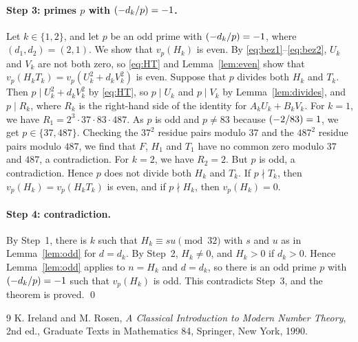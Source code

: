 \documentclass[11pt]{article}
\newcommand{\leg}[2]{\mathchoice{\biggl(\dfrac{#1}{#2}\biggr)}{(#1/#2)}{(#1/#2)}{(#1/#2)}}
\begin{document}
\paragraph{Step 3: primes $p$ with $\leg{-d_k}{p}=-1$.} Let $k\in\{1,2\}$, and let $p$ be an odd prime with $\leg{-d_k}{p}=-1$, where $(d_{1},d_{2})=(2,1)$. We show that $v_p(H_k)$ is even. By \eqref{eq:bez1}--\eqref{eq:bez2}, $U_k$ and $V_k$ are not both zero, so \eqref{eq:HT} and Lemma~\ref{lem:even} show that $v_p(H_kT_k)=v_p(U_k^2+d_kV_k^2)$ is even. Suppose that $p$ divides both $H_k$ and $T_k$. Then $p\mid U_k^2+d_kV_k^2$ by \eqref{eq:HT}, so $p\mid U_k$ and $p\mid V_k$ by Lemma~\ref{lem:divides}, and $p\mid R_k$, where $R_k$ is the right-hand side of the identity for $A_kU_k+B_kV_k$. For $k=1$, we have $R_{1}=2^{3}\cdot 37\cdot 83\cdot 487$. As $p$ is odd and $p\neq83$ because $\leg{-2}{83}=1$, we get $p\in\{37,487\}$. Checking the $37^2$ residue pairs modulo $37$ and the $487^2$ residue pairs modulo $487$, we find that $F$, $H_{1}$ and $T_{1}$ have no common zero modulo $37$ and $487$, a contradiction. For $k=2$, we have $R_{2}=2$. But $p$ is odd, a contradiction. Hence $p$ does not divide both $H_k$ and $T_k$. If $p\nmid T_k$, then $v_p(H_k)=v_p(H_kT_k)$ is even, and if $p\nmid H_k$, then $v_p(H_k)=0$.

\paragraph{Step 4: contradiction.} By Step~1, there is $k$ such that $H_k\equiv su\pmod{32}$ with $s$ and $u$ as in Lemma~\ref{lem:odd} for $d=d_k$. By Step~2, $H_k\neq0$, and $H_k>0$ if $d_k>0$. Hence Lemma~\ref{lem:odd} applies to $n=H_k$ and $d=d_k$, so there is an odd prime $p$ with $\leg{-d_k}{p}=-1$ such that $v_p(H_k)$ is odd. This contradicts Step~3, and the theorem is proved.
\qed

\begin{thebibliography}{9}
 K. Ireland and M. Rosen, \emph{A Classical Introduction to Modern Number Theory}, 2nd ed., Graduate Texts in Mathematics 84, Springer, New York, 1990.
\end{thebibliography}
\end{document}
